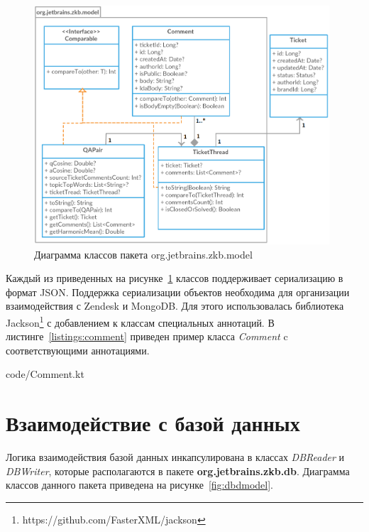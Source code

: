 \begin{figure}[tph!]
\centerline{\includegraphics[width=11cm]{fig/model.png}}
    \caption{Диаграмма классов пакета org.jetbrains.zkb.model}
    \label{fig:umodel}
\end{figure}

Каждый из приведенных на рисунке~\ref{fig:umodel} классов поддерживает сериализацию в формат JSON. Поддержка сериализации объектов необходима для организации взаимодействия с Zendesk и MongoDB. Для этого использовалась библиотека Jackson\footnote{https://github.com/FasterXML/jackson} с добавлением к классам специальных аннотаций. В листинге~\ref{listings:comment} приведен пример класса \textit{Comment} c соответствующими аннотациями.


{code/Comment.kt}

\section{Взаимодействие с базой данных}

Логика взаимодействия базой данных инкапсулирована в классах \textit{DBReader} и \textit{DBWriter}, которые располагаются в пакете \textbf{org.jetbrains.zkb.db}. Диаграмма классов данного пакета приведена на рисунке~\ref{fig:dbdmodel}.

